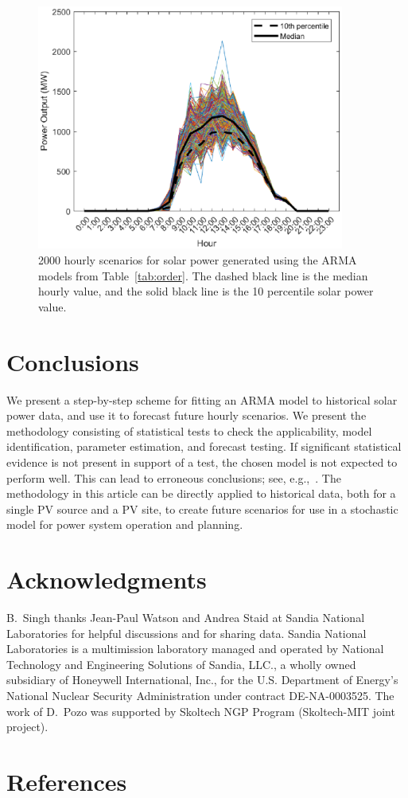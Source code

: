 \documentclass[review]{elsarticle}
\begin{document}
\begin{figure}[!t]
\centering
\includegraphics[width=0.9\textwidth]{sample_smooth.eps}
\caption{2000 hourly scenarios for solar power generated using the ARMA models 
from Table~\ref{tab:order}. The dashed black line is the median hourly value, 
and the solid black line is
the 10 percentile solar power value.}
 \label{fig:sample}
\end{figure}

\section{Conclusions}
We present a step-by-step scheme for fitting an ARMA model to 
historical solar power data, and use it to forecast future hourly scenarios. 
We present the methodology consisting of statistical tests to check the 
applicability, model identification, parameter estimation, and forecast 
testing. If significant statistical evidence is not present in support of a 
test, the chosen model is not expected to perform well. This can lead to 
erroneous conclusions; see, 
e.g.,~\cite{kwiatkowski1992testing,phillips1988testing}.
The methodology in this article can be directly applied to historical data, 
both for a single PV source and a PV site,
to create future scenarios for use in a stochastic model for power system 
operation and planning.




\section*{Acknowledgments} 
B.\ Singh thanks Jean-Paul Watson and Andrea Staid at Sandia National 
Laboratories for helpful discussions and for sharing data. 
Sandia National Laboratories is a multimission laboratory managed and operated 
by National Technology and Engineering Solutions of Sandia, LLC., a wholly owned
subsidiary of Honeywell International, Inc., for the U.S. Department of 
Energy's 
National Nuclear Security Administration under contract DE-NA-0003525.
The work of D.\ Pozo was supported by Skoltech NGP Program (Skoltech-MIT joint 
project).

\section*{References}


\end{document}
